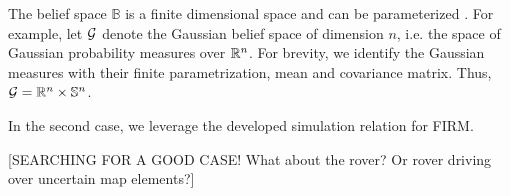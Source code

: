 \documentclass{ifacconf}
\newcommand{\red}[1]{{\color{red} #1}}
\begin{document}
 
The belief space $\mathbb{B}$ is  a finite dimensional space and can be parameterized . For example, let $\mathcal{G}$ denote the Gaussian belief space
    of dimension $n$, i.e. the space of Gaussian
    probability measures over $\mathbb{R}^n$.
    For brevity, we identify the Gaussian measures
    with their finite parametrization, mean and
    covariance matrix.
     Thus,
    $\mathcal{G} =  \mathbb{R}^n \times  \mathbb S^n$.
    
    
 
 In the second case, we leverage the developed simulation relation for FIRM. 
 
 \red{[SEARCHING FOR A GOOD CASE! What about the rover? Or rover driving over uncertain map elements?]}





\end{document}
